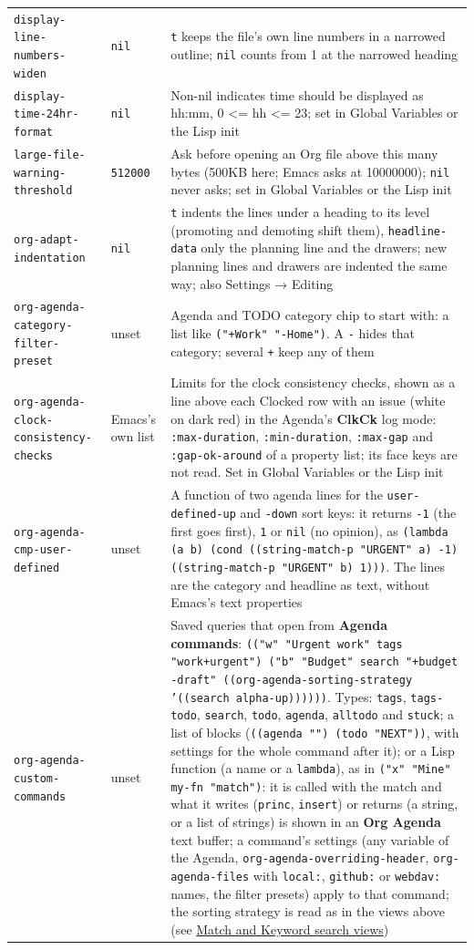 \documentclass[11pt]{article}
\begin{document}
\begin{center}
\begin{tabular}{lll}
\texttt{display-line-numbers-widen} & \texttt{nil} & \texttt{t} keeps the file's own line numbers in a narrowed outline; \texttt{nil} counts from 1 at the narrowed heading\\[0pt]
\texttt{display-time-24hr-format} & \texttt{nil} & Non-nil indicates time should be displayed as hh:mm, 0 <= hh <= 23; set in Global Variables or the Lisp init\\[0pt]
\texttt{large-file-warning-threshold} & \texttt{512000} & Ask before opening an Org file above this many bytes (500KB here; Emacs asks at 10000000); \texttt{nil} never asks; set in Global Variables or the Lisp init\\[0pt]
\texttt{org-adapt-indentation} & \texttt{nil} & \texttt{t} indents the lines under a heading to its level (promoting and demoting shift them), \texttt{headline-data} only the planning line and the drawers; new planning lines and drawers are indented the same way; also Settings → Editing\\[0pt]
\texttt{org-agenda-category-filter-preset} & unset & Agenda and TODO category chip to start with: a list like \texttt{("+Work" "-Home")}. A \texttt{-} hides that category; several \texttt{+} keep any of them\\[0pt]
\texttt{org-agenda-clock-consistency-checks} & Emacs's own list & Limits for the clock consistency checks, shown as a line above each Clocked row with an issue (white on dark red) in the Agenda's \textbf{ClkCk} log mode: \texttt{:max-duration}, \texttt{:min-duration}, \texttt{:max-gap} and \texttt{:gap-ok-around} of a property list; its face keys are not read. Set in Global Variables or the Lisp init\\[0pt]
\texttt{org-agenda-cmp-user-defined} & unset & A function of two agenda lines for the \texttt{user-defined-up} and \texttt{-down} sort keys: it returns \texttt{-1} (the first goes first), \texttt{1} or \texttt{nil} (no opinion), as \texttt{(lambda (a b) (cond ((string-match-p "URGENT" a) -1) ((string-match-p "URGENT" b) 1)))}. The lines are the category and headline as text, without Emacs's text properties\\[0pt]
\texttt{org-agenda-custom-commands} & unset & Saved queries that open from \textbf{Agenda commands}: \texttt{(("w" "Urgent work" tags "work+urgent") ("b" "Budget" search "+budget -draft" ((org-agenda-sorting-strategy '((search alpha-up))))))}. Types: \texttt{tags}, \texttt{tags-todo}, \texttt{search}, \texttt{todo}, \texttt{agenda}, \texttt{alltodo} and \texttt{stuck}; a list of blocks (\texttt{((agenda "") (todo "NEXT"))}, with settings for the whole command after it); or a Lisp function (a name or a \texttt{lambda}), as in \texttt{("x" "Mine" my-fn "match")}: it is called with the match and what it writes (\texttt{princ}, \texttt{insert}) or returns (a string, or a list of strings) is shown in an \textbf{Org Agenda} text buffer; a command's settings (any variable of the Agenda, \texttt{org-agenda-overriding-header}, \texttt{org-agenda-files} with \texttt{local:}, \texttt{github:} or \texttt{webdav:} names, the filter presets) apply to that command; the sorting strategy is read as in the views above (see \hyperref[sec:orge4d4453]{Match and Keyword search views})\\[0pt]

\end{tabular}
\end{center}
\end{document}
